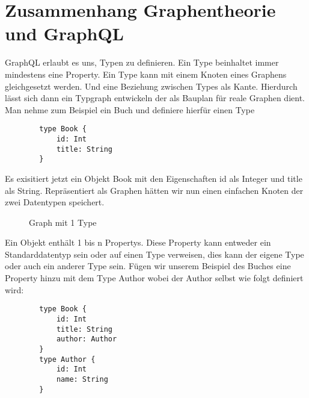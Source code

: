 \section{Zusammenhang Graphentheorie und GraphQL}

GraphQL erlaubt es uns, Typen zu definieren. Ein Type beinhaltet immer mindestens eine Property. Ein Type kann mit einem
Knoten eines Graphens gleichgesetzt werden. Und eine Beziehung zwischen Types als Kante. Hierdurch lässt sich dann
ein Typgraph entwickeln der als Bauplan für reale Graphen dient.
Man nehme zum Beispiel ein Buch und definiere hierfür einen Type

\begin{center}
    \begin{verbatim}
        type Book {
            id: Int
            title: String
        }
    \end{verbatim}
\end{center}

Es exisitiert jetzt ein Objekt Book mit den Eigenschaften id als Integer und title als String.
Repräsentiert als Graphen hätten wir nun einen einfachen Knoten der zwei Datentypen speichert.

\begin{figure}[!htbp]
    \begin{center}
    \caption{Graph mit 1 Type}
    \end{center}
    \label{fig:1type}
\end{figure}

Ein Objekt enthält 1 bis n Propertys. Diese Property kann entweder ein Standarddatentyp sein oder auf einen Type verweisen,
dies kann der eigene Type oder auch ein anderer Type sein.
Fügen wir unserem Beispiel des Buches eine Property hinzu mit dem Type Author wobei der Author selbst
wie folgt definiert wird:

\begin{center}
    \begin{verbatim}
        type Book {
            id: Int
            title: String
            author: Author
        }
        type Author {
            id: Int
            name: String
        }
    \end{verbatim}
\end{center}


